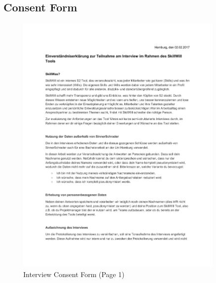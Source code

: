 \begin{appendices}
\section{Consent Form}
\label{consentform}
\begin{figure}[!h]
    \centering
    \includegraphics[width=0.9\textwidth,page=1]{images/Interview_Consent.pdf}
    \caption[Interview Consent Form]{Interview Consent Form (Page 1)}
\end{figure}
\begin{figure}[!h]
    \centering

\end{figure}
\end{appendices}
